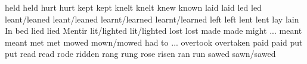 	            {held}{}	            {held}{}                {}{}
	            {hurt}{}	            {hurt}{}                {}{}
	            {kept}{}	            {kept}{}                {}{}
	            {knelt}{}	            {knelt}{}               {}{}
	            {knew}{}	            {known}{}               {}{}
	            {laid}{}	            {laid}{}                {}{}
	            {led}{}	                {led}{}                 {}{}
	            {leant/leaned}{}	    {leant/leaned}{}        {}{}
	            {learnt/learned}{}	    {learnt/learned}{}      {}{}
	            {left}{}	            {left}{}                {}{}
	            {lent}{}	            {lent}{}                {}{}
	            {lay}{}	                {lain}{}                {In bed}{}
	                {lied}{}	            {lied}{}                {Mentir}{}
	            {lit/lighted}{}	        {lit/lighted}{}         {}{}
	            {lost}{}	            {lost}{}                {}{}
	            {made}{}	            {made}{}                {}{}
	            {might}{}	            {...}{}                 {}{}
	            {meant}{}	            {meant}{}               {}{}
	            {met}{}	                {met}{}                 {}{}
	            {mowed}{}	            {mown/mowed}{}          {}{}
	            {had to}{}	            {...}{}                 {}{}
	        {overtook}{}	        {overtaken}{}           {}{}
	            {paid}{}	            {paid}{}                {}{}
	            {put}{}	                {put}{}                 {}{}
	            {read}{}	            {read}{}                {}{}
	            {rode}{}	            {ridden}{}              {}{}
	            {rang}{}	            {rung}{}                {}{}
	            {rose}{}	            {risen}{}               {}{}
	            {ran}{}	                {run}{}                 {}{}
	            {sawed}{}	            {sawn/sawed}{}          {}{}
